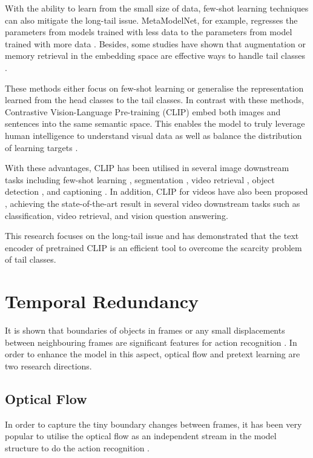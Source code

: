 With the ability to learn from the small size of data, few-shot learning techniques can also mitigate the long-tail issue. MetaModelNet, for example, regresses the parameters from models trained with less data to the parameters from model trained with more data \parencite{NIPS2017_147ebe63}. Besides, some studies have shown that augmentation or memory retrieval in the embedding space are effective ways to handle tail classes \parencite{liu2019large, Zhu_2020_CVPR, li2021metasaug, Fu_2022_ACCV}.

These methods either focus on few-shot learning or generalise the representation learned from the head classes to the tail classes. In contrast with these methods, Contrastive Vision-Language Pre-training (CLIP) \parencite{radford2021learning} embed both images and sentences into the same semantic space. This enables the model to truly leverage human intelligence to understand visual data as well as balance the distribution of learning targets \parencite{ma2022x}. 

With these advantages, CLIP has been utilised in several image downstream tasks including few-shot learning \parencite{zhang2022tip}, segmentation \parencite{wang2022cris}, video retrieval \parencite{ma2022x}, object detection \parencite{lin2023gridclip}, and captioning \parencite{mokady2021clipcap}. In addition, CLIP for videos have also been proposed \parencite{xu-etal-2021-videoclip, wang2022internvideo}, achieving the state-of-the-art result in several video downstream tasks such as classification, video retrieval, and vision question answering.

This research focuses on the long-tail issue and has demonstrated that the text encoder of pretrained CLIP is an efficient tool to overcome the scarcity problem of tail classes.


\section{Temporal Redundancy}
It is shown that boundaries of objects in frames or any small displacements between neighbouring frames are significant features for action recognition \parencite{10.1007/978-3-030-12939-2_20}. In order to enhance the model in this aspect, optical flow and pretext learning are two research directions. 

\subsection{Optical Flow}
In order to capture the tiny boundary changes between frames, it has been very popular to utilise the optical flow as an independent stream in the model structure to do the action recognition \parencite{Piergiovanni_2019_CVPR}. 

